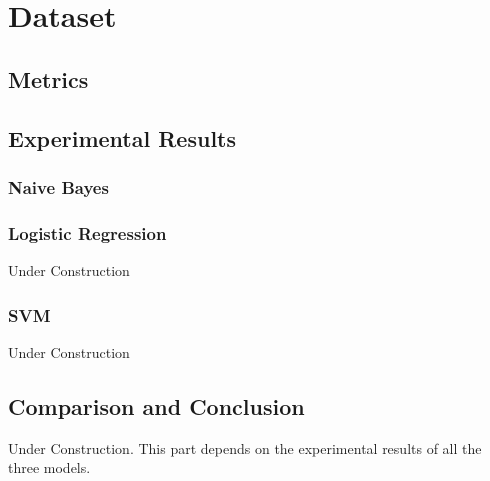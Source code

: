 
\section{Dataset}

\subsection{Metrics}

\subsection{Experimental Results}
\subsubsection{Naive Bayes}

\subsubsection{Logistic Regression}
Under Construction

\subsubsection{SVM}
Under Construction

\subsection{Comparison and Conclusion}
Under Construction. This part depends on the experimental results of all the three models.
